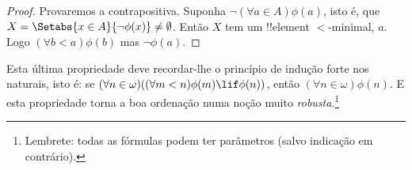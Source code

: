 \documentclass[../../../include/open-logic-section]{subfiles}
\begin{document}
\begin{proof}
Provaremos a contrapositiva. Suponha $\lnot(\forall a \in
A)\phi(a)$, isto é, que $X = \Setabs{x \in A}{\lnot\phi(x)} \neq
\emptyset$. Então $X$ tem um !!{element} $<$-minimal, $a$. Logo $(\forall
b < a)\phi(b)$ mas $\lnot \phi(a)$. \end{proof}\noindent Esta última
propriedade deve recordar-lhe o princípio de indução forte nos naturais,
isto é: se $(\forall n \in \omega)((\forall m < n)\phi(m)
\lif \phi(n))$, então $(\forall n \in \omega)\phi(n)$. E esta
propriedade torna a boa ordenação numa noção muito \emph{robusta}.\footnote{Lembrete: todas as fórmulas podem ter parâmetros (salvo indicação em contrário).} 
\end{document}

